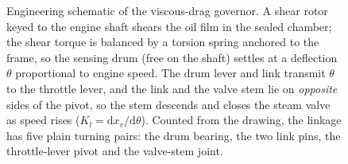 \documentclass[conference]{IEEEtran}
\begin{document}
\begin{figure}[t]
{}
\caption{Engineering schematic of the viscous-drag governor. A shear rotor keyed to
the engine shaft shears the oil film in the sealed chamber; the shear torque is
balanced by a torsion spring anchored to the frame, so the sensing drum (free on the
shaft) settles at a deflection $\theta$ proportional to engine speed. The drum lever
and link transmit $\theta$ to the throttle lever, and the link and the valve stem lie
on \emph{opposite} sides of the pivot, so the stem descends and closes the steam
valve as speed rises ($K_l=\mathrm{d}x_v/\mathrm{d}\theta$). Counted from the
drawing, the linkage has five plain turning pairs: the drum bearing, the two link
pins, the throttle-lever pivot and the valve-stem joint.}
\label{fig:schematic}
\end{figure}
\end{document}
